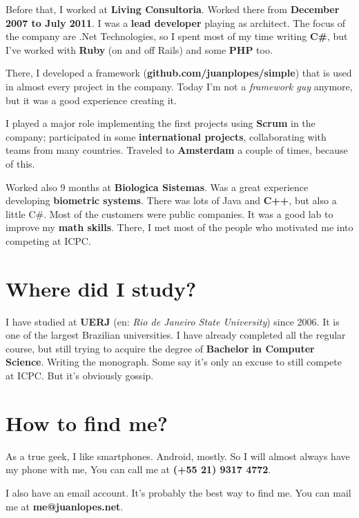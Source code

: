 \documentclass[a4paper,12pt,notitlepage]{article}
\begin{document}
	Before that, I worked at \textbf{Living Consultoria}. Worked there from \textbf{December 2007 to July 2011}. I was a \textbf{lead developer} playing as architect. The focus of the company are .Net Technologies, so I spent most of my time writing \textbf{C\#}, but I've worked with \textbf{Ruby} (on and off Rails) and some \textbf{PHP} too. 
	
	There, I developed a framework (\textbf{github.com/juanplopes/simple}) that is used in almost every project in the company. Today I'm not a \emph{framework guy} anymore, but it was a good experience creating it. 
	
	I played a major role implementing the first projects using \textbf{Scrum} in the company; participated in some \textbf{international projects}, collaborating with teams from many countries. Traveled to \textbf{Amsterdam} a couple of times, because of this.
	
	Worked also 9 months at \textbf{Biologica Sistemas}. Was a great experience developing \textbf{biometric systems}. There was lots of Java and \textbf{C++}, but also a little C\#. Most of the customers were public companies. It was a good lab to improve my \textbf{math skills}. There, I met most of the people who motivated me into competing at ICPC.

\section{Where did I study?}

	I have studied at \textbf{UERJ} (en: \emph{Rio de Janeiro State University}) since 2006. It is one of the largest Brazilian universities. I have already completed all the regular course, but still trying to acquire the degree of \textbf{Bachelor in Computer Science}. Writing the monograph. Some say it's only an excuse to still compete at ICPC. But it's obviously gossip.

\section{How to find me?}

	As a true geek, I like smartphones. Android, mostly. So I will almost always have my phone with me, You can call me at \textbf{(+55 21) 9317 4772}.
	
	I also have an email account. It’s probably the best way to find me. You can mail me at \textbf{me@juanlopes.net}.
\end{document}
